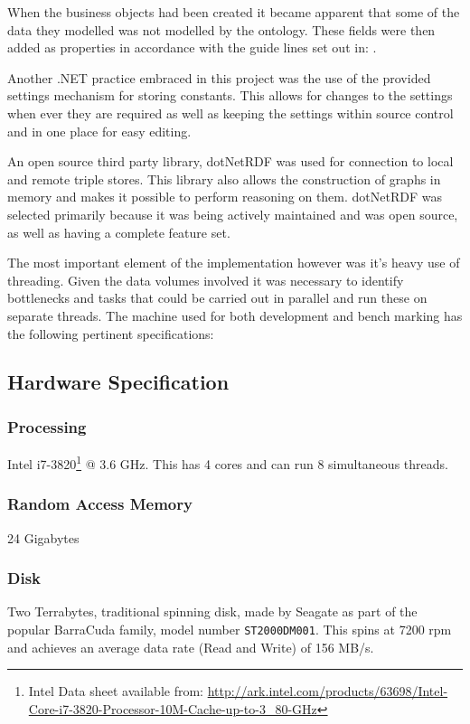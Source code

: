When the business objects had been created it became apparent that some of the data they modelled was not modelled by the ontology. These fields were then added as properties in accordance with the guide lines set out in: \citet{Tutcher2015}.

Another .NET practice embraced in this project was the use of the provided settings mechanism for storing constants. This allows for changes to the settings when ever they are required as well as keeping the settings within source control and in one place for easy editing. 

An open source third party library, dotNetRDF was used for connection to local and remote triple stores. This library also allows the construction of graphs in memory and makes it possible to perform reasoning on them. dotNetRDF was selected primarily because it was being actively maintained and was open source, as well as having a complete feature set. 


The most important element of the implementation however was it's heavy use of threading. Given the data volumes involved it was necessary to identify bottlenecks and tasks that could be carried out in parallel and run these on separate threads. The machine used for both development and bench marking has the following pertinent specifications:
\subsection{Hardware Specification}

 	\subsubsection*{Processing} Intel i7-3820\footnote{Intel Data sheet available from: \url{http://ark.intel.com/products/63698/Intel-Core-i7-3820-Processor-10M-Cache-up-to-3_80-GHz}} @ 3.6 GHz. This has 4 cores and can run 8 simultaneous threads.
 	\subsubsection*{Random Access Memory}24 Gigabytes
 	\subsubsection*{Disk} Two Terrabytes, traditional spinning disk, made by Seagate as part of the popular BarraCuda family, model number \texttt{ST2000DM001}. This spins at 7200 rpm and achieves an average data rate (Read and Write) of 156 MB/s.
 
